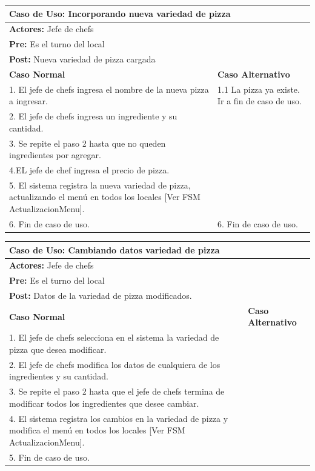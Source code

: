 \documentclass[a4paper,11pt] {article}
\begin{document}
\begin{center}
	\begin{tabular}{ | p{6.5cm} | p{6.5cm} | }
		\hline
			\multicolumn{2}{|l|}{\textbf{Caso de Uso:} Incorporando nueva variedad de pizza} \\
		\hline
			\multicolumn{2}{|l|}{\textbf{Actores:} Jefe de chefs} \\
		\hline
			\multicolumn{2}{|l|}{\textbf{Pre:} Es el turno del local} \\
		\hline
			\multicolumn{2}{|l|}{\textbf{Post:} Nueva variedad de pizza cargada} \\
		\hline
		\textbf{Caso Normal} & \textbf{Caso Alternativo}	\\
		\hline
		1. El jefe de chefs ingresa el nombre de la nueva pizza a ingresar. & 1.1 La pizza ya existe. Ir a fin de caso de uso.	\\
		\hline
		2. El jefe de chefs ingresa un ingrediente y su cantidad. &	\\
		\hline
		3. Se repite el paso 2 hasta que no queden ingredientes por agregar. &	\\
		\hline
		4.EL jefe de chef ingresa el precio de pizza. &	\\
		\hline
		5. El sistema registra la nueva variedad de pizza, actualizando el men\'u en todos los locales [Ver FSM ActualizacionMenu]. &	\\
		\hline
		6. Fin de caso de uso. & 6. Fin de caso de uso.	\\
		\hline
	\end{tabular}
\end{center}

\begin{center}
	\begin{tabular}{ | p{6.5cm} | p{6.5cm} | }
		\hline
			\multicolumn{2}{|l|}{\textbf{Caso de Uso:} Cambiando datos variedad de pizza} \\
		\hline
			\multicolumn{2}{|l|}{\textbf{Actores:} Jefe de chefs} \\
		\hline
			\multicolumn{2}{|l|}{\textbf{Pre:} Es el turno del local} \\
		\hline
			\multicolumn{2}{|l|}{\textbf{Post:} Datos de la variedad de pizza modificados.} \\
		\hline
		\textbf{Caso Normal} & \textbf{Caso Alternativo}	\\
		\hline
		1. El jefe de chefs selecciona en el sistema la variedad de pizza que desea modificar. & 	\\
		\hline
		2. El jefe de chefs modifica los datos de cualquiera de los ingredientes y su cantidad.  &	\\
		\hline
		3. Se repite el paso 2 hasta que el jefe de chefs termina de modificar todos los ingredientes que desee cambiar. &	\\
		\hline
		4. El sistema registra los cambios en la variedad de pizza y modifica el men\'u en todos los locales [Ver FSM ActualizacionMenu].  &	\\
		\hline
		5. Fin de caso de uso. &	\\
		\hline
	\end{tabular}
\end{center}
\end{document}
